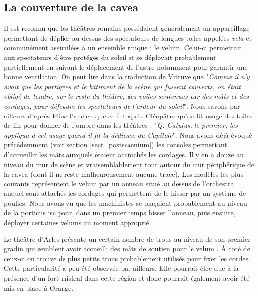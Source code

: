 		\subsection{La couverture de la \gls{cavea}} \label{section velum}
		
		Il est reconnu que les théâtres romains possédaient généralement un appareillage permettant de déplier au dessus des spectateurs de longues toiles appelées \textit{vela} et communément assimilées à un ensemble unique : le \gls{velum}. Celui-ci permettait aux spectateurs d'être protégés du soleil et se déployait probablement partiellement en suivant le déplacement de l'astre notamment pour garantir une bonne ventilation. On peut lire dans la traduction de Vitruve\cite[p. 38]{vitruve} que "\textit{Comme il n'y avait que les portiques et le bâtiment de la scène qui fussent couverts, on était obligé de tendre, sur le reste du théâtre, des voiles soutenues par des mâts et des cordages, pour défendre les spectateurs de l'ardeur du soleil}". Nous savons par ailleurs d'après Pline l'ancien \cite[V-VI]{pline} que ce fut après Cléopâtre qu'on fit usage des toiles de lin pour donner de l'ombre dans les théâtres : "\textit{Q. Catulus, le premier, les appliqua à cet usage quand il fit la dédicace du Capitole}". Nous avons déjà évoqué précédemment (voir section \ref{sect_postscaenium}) les \glspl{console} permettant d'accueillir les mâts auxquels étaient accrochés les cordages. Il y en a douze au niveau du mur de scène et vraisemblablement tout autour du mur périphérique de la \gls{cavea} (dont il ne reste malheureusement aucune trace). Les modèles les plus courants représentent le \gls{velum} par un anneau situé au dessus de l'\gls{orchestra} auquel sont attachés les cordages qui permettent de le hisser par un système de poulies. Nous avons vu que les machinistes se plaçaient probablement au niveau de la \gls{porticus isc} pour, dans un premier temps hisser l'anneau, puis ensuite, déployer certaines \glspl{velum} au moment approprié.  
		
		Le théâtre d'Arles présente un certain nombre de trous au niveau de son premier gradin qui semblent avoir accueilli des mâts de soutien pour le \gls{velum} \cite[p. 38]{formige}. \`{A} coté de ceux-ci on trouve de plus petits trous probablement utilisés pour fixer les cordes. Cette particularité a peu été observée par ailleurs. Elle pourrait être due à la présence d'un fort mistral dans cette région et donc pourrait également avoir été mis en place à Orange. 

